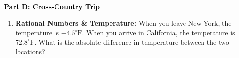 \documentclass[12pt, letterpaper, fleqn]{article}
\begin{document}
\newpage

\begin{tcolorbox}[colback=customteal!20]
\large\textcolor{black}{\textbf{Part D: Cross-Country Trip}}
\end{tcolorbox}

\vspace{3mm}

\begin{enumerate}[itemsep=4.2cm, leftmargin=0.6cm, resume]
\item \textbf{Rational Numbers \& Temperature:} When you leave New York, the temperature is $-4.5^\circ\text{F}$. When you arrive in California, the temperature is $72.8^\circ\text{F}$. What is the absolute difference in temperature between the two locations?
\end{enumerate}
\end{document}
